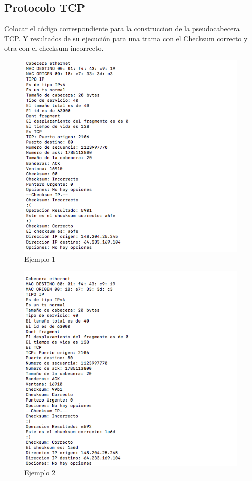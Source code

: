\subsection{Protocolo TCP}
Colocar el c\'odigo correspondiente para la construccion de la pseudocabecera TCP. Y resultados de su ejecuci\'on para una trama con el Checksum correcto y otra con el checksum incorrecto.
		\begin{figure}[h]
			\centering		
			\includegraphics[width=\textwidth]{tcp1}
			\caption{Ejemplo 1}
		\end{figure}
	\begin{figure}[h]
			\centering		
			\includegraphics[width=\textwidth]{tcp2}
			\caption{Ejemplo 2}
		\end{figure}
\clearpage
